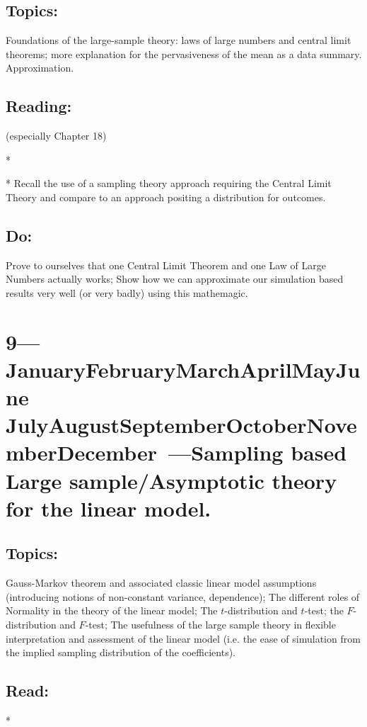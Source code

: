 \documentclass[10pt]{article}
\def\themonth{\ifcase\month\or
  January\or February\or March\or April\or May\or June\or
  July\or August\or September\or October\or November\or December\fi}
\begin{document}
\subsection{Topics:} Foundations of the large-sample theory: laws of
large numbers and central limit theorems; more explanation for the
pervasiveness of the mean as a data summary. Approximation.

\subsection{Reading:}
\citealp[Chap 16--18]{fpp07} (especially Chapter 18)


*\citealp[Chap 8]{trosset2009isi}

*\citealp[Chap 2.7--2.8]{lohr:1999} Recall the use of a sampling
theory approach requiring the Central Limit Theory and compare to an approach
positing a distribution for outcomes.

\subsection{Do:} Prove to ourselves that one Central Limit Theorem and
one Law of Large Numbers actually works; Show how we can approximate
our simulation based results very well (or very badly) using this mathemagic.

\AdvanceDate[7]
\section{9---\themonth~\the\day---Sampling based Large sample/Asymptotic theory
  for the linear model.}

\subsection{Topics:} Gauss-Markov theorem and associated classic
linear model assumptions (introducing notions of non-constant
variance, dependence); The different roles of Normality in the theory
of the linear model; The $t$-distribution and $t$-test; the
$F$-distribution and $F$-test; The usefulness of the large sample
theory in flexible interpretation and assessment of the linear model
(i.e. the ease of simulation from the implied sampling distribution of
the coefficients).

\subsection{Read:}
*\citealp[Chap 6,9]{fox2008applied}
\end{document}
